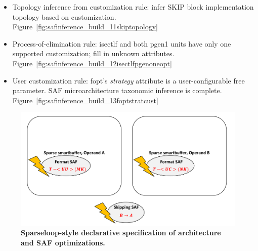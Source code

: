 \begin{itemize}
    \item Topology inference from customization rule: infer SKIP block implementation topology based on customization. Figure~\ref{fig:safinference_build_11skiptopology}
    \item Process-of-elimination rule: isectlf and both pgen1 units have only one supported customization; fill in unknown attributes. Figure~\ref{fig:safinference_build_12isectlfpgenoneopt}
    \item User customization rule: fopt's \textit{strategy} attribute is a user-configurable free parameter. SAF microarchitecture taxonomic inference is complete. Figure~\ref{fig:safinference_build_13foptstratcust}
\end{itemize}

\begin{figure}[H]
\includegraphics[width=\textwidth]{figures/safinfer_build_00saf.pdf}
\caption{\textbf{Sparseloop-style declarative specification of architecture and SAF optimizations.}}
\label{fig:safinfer_build_00saf}
\centering
\end{figure}

\clearpage

